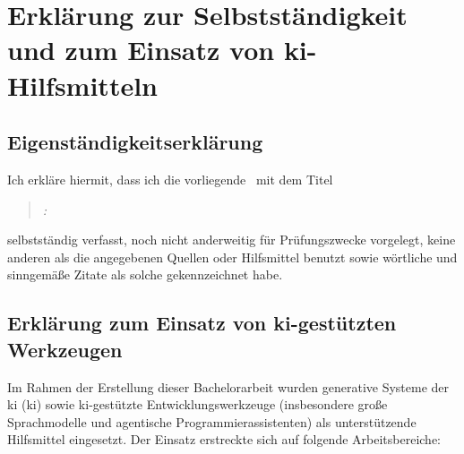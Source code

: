 \chapter{Erklärung zur Selbstständigkeit und zum Einsatz von \texorpdfstring{\acs{ki}}{KI}-Hilfsmitteln}
\label{chap:erklaerung}

\section*{Eigenständigkeitserklärung}

Ich erkläre hiermit, dass ich die vorliegende \thesistype\ mit dem Titel

\begin{quote}
  \emph{\thesismaintitleDE: \thesissubtitleDE}
\end{quote}

selbstständig verfasst, noch nicht anderweitig für Prüfungszwecke vorgelegt, keine anderen als die angegebenen Quellen oder Hilfsmittel benutzt sowie wörtliche und sinngemäße Zitate als solche gekennzeichnet habe.

\section*{Erklärung zum Einsatz von \texorpdfstring{\acs{ki}}{KI}-gestützten Werkzeugen}

Im Rahmen der Erstellung dieser Bachelorarbeit wurden generative Systeme der \acl{ki} (\acs{ki}) sowie \acs{ki}-gestützte Entwicklungswerkzeuge (insbesondere große Sprachmodelle und agentische Programmierassistenten) als unterstützende Hilfsmittel eingesetzt. Der Einsatz erstreckte sich auf folgende Arbeitsbereiche:

